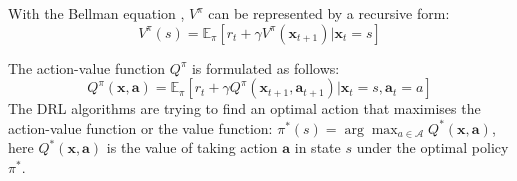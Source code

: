 
With the Bellman equation \cite{bellman1966dynamic}, $V^\pi$ can be represented by a recursive form:
\begin{equation}
    V^\pi(s) = \mathbb{E}_\pi[r_t+\gamma V^\pi(\textbf{x}_{t+1})|\textbf{x}_t=s]
\end{equation}

The action-value function $Q^\pi$ is formulated as follows:
\begin{equation}
    Q^\pi(\textbf{x},\textbf{a}) = \mathbb{E}_\pi[r_t+\gamma Q^\pi(\textbf{x}_{t+1},\textbf{a}_{t+1})|\textbf{x}_t=s,\textbf{a}_t = a]
\end{equation}
The \gls{DRL} algorithms are trying to find an optimal action that maximises the action-value function or the value function: $\pi^*(s) = \arg\max_{a\in\mathcal{A}} Q^*(\textbf{x},\textbf{a})$, here $Q^*(\textbf{x},\textbf{a})$ is the value of taking action $\textbf{a}$ in state $s$ under the optimal policy $\pi^*$. 

\fi


